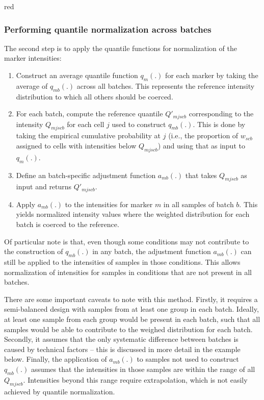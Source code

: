 \documentclass{article}
\begin{document}
\begin{color}{red}
\subsubsection{Performing quantile normalization across batches}
The second step is to apply the quantile functions for normalization of the marker intensities:
\begin{enumerate}
    \item Construct an average quantile function $q_m(.)$ for each marker by taking the average of $q_{mb}(.)$ across all batches.
        This represents the reference intensity distribution to which all others should be coerced.
    \item For each batch, compute the reference quantile $Q'_{mjscb}$ corresponding to the intensity $Q_{mjscb}$ for each cell $j$ used to construct $q_{mb}(.)$.
        This is done by taking the empirical cumulative probability at $j$ (i.e., the proportion of $w_{scb}$ assigned to cells with intensities below $Q_{mjscb}$) and using that as input to $q_m(.)$.
    \item Define an batch-specific adjustment function $a_{mb}(.)$ that takes $Q_{mjscb}$ as input and returns $Q'_{mjscb}$.
    \item Apply $a_{mb}(.)$ to the intensities for marker $m$ in all samples of batch $b$.
        This yields normalized intensity values where the weighted distribution for each batch is coerced to the reference. 
\end{enumerate}
Of particular note is that, even though some conditions may not contribute to the construction of $q_{mb}(.)$ in any batch, the adjustment function $a_{mb}(.)$ can still be applied to the intensities of samples in those conditions.
This allows normalization of intensities for samples in conditions that are not present in all batches.

There are some important caveats to note with this method.
Firstly, it requires a semi-balanced design with samples from at least one group in each batch.
Ideally, at least one sample from each group would be present in each batch, such that all samples would be able to contribute to the weighed distribution for each batch.
Secondly, it assumes that the only systematic difference between batches is caused by technical factors -- this is discussed in more detail in the example below.
Finally, the application of $a_{mb}(.)$ to samples not used to construct $q_{mb}(.)$ assumes that the intensities in those samples are within the range of all $Q_{mjscb}$.
Intensities beyond this range require extrapolation, which is not easily achieved by quantile normalization.


\end{color}
\end{document}
